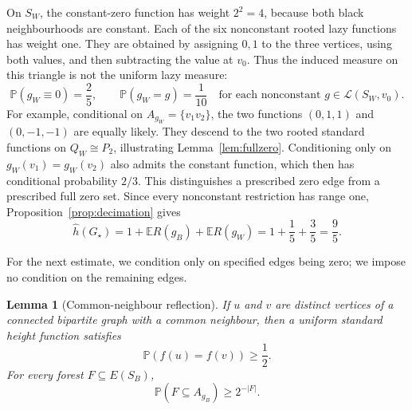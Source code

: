 \documentclass[11pt,reqno]{amsart}
\newtheorem{lemma}[theorem]{Lemma}
\theoremstyle{remark}
\numberwithin{equation}{section}
\newcommand{\E}{\mathbb E}
\newcommand{\PP}{\mathbb P}
\newcommand{\LL}{\mathcal L}
\begin{document}
On $S_W$, the constant-zero function has weight $2^2=4$,
because both black neighbourhoods are constant. Each of the six
nonconstant rooted lazy functions has weight one. They are obtained
by assigning $0,1$ to the three vertices, using both values, and
then subtracting the value at $v_0$. Thus the induced measure on
this triangle is not the uniform lazy measure:
\[
 \PP(g_W\equiv0)=\frac25,\qquad
 \PP(g_W=g)=\frac1{10}
 \quad\text{for each nonconstant }g\in\LL(S_W,v_0).
\]
For example, conditional on $A_{g_W}=\{v_1v_2\}$, the two functions
$(0,1,1)$ and $(0,-1,-1)$ are equally likely. They descend to the
two rooted standard functions on $Q_W\cong P_2$, illustrating
Lemma~\ref{lem:fullzero}. Conditioning only on
$g_W(v_1)=g_W(v_2)$ also admits the constant function, which then
has conditional probability $2/3$. This distinguishes a prescribed
zero edge from a prescribed full zero set.
Since every nonconstant restriction has
range one, Proposition~\ref{prop:decimation} gives
\[
 \widehat h(G_\star)
   =1+\E R(g_B)+\E R(g_W)
   =1+\frac15+\frac35=\frac95.
\]


For the next estimate, we condition only on specified edges being zero;
we impose no condition on the remaining edges.

\begin{lemma}[Common-neighbour reflection]\label{lem:reflection}
If $u$ and $v$ are distinct vertices of a connected bipartite graph with
a common neighbour, then a uniform standard height function satisfies
\begin{equation}\label{eq:reflection}
 \PP(f(u)=f(v))\ge\frac12.
\end{equation}
For every forest $F\subseteq E(S_B)$,
\begin{equation}\label{eq:bhm-forest}
 \PP(F\subseteq A_{g_B})\ge 2^{-|F|}.
\end{equation}
\end{lemma}
\end{document}
